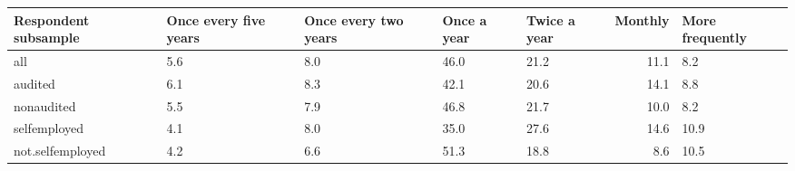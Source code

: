 \begin{table}[ht]
\centering
\begin{tabular}{lL{2cm}L{2cm}L{2cm}L{2cm}rL{2cm}}
  \hline
Respondent subsample & Once every five years & Once every two years & Once a year & Twice a year & Monthly & More frequently \\ 
  \hline
all & 5.6 & 8.0 & 46.0 & 21.2 & 11.1 & 8.2 \\ 
  audited & 6.1 & 8.3 & 42.1 & 20.6 & 14.1 & 8.8 \\ 
  nonaudited & 5.5 & 7.9 & 46.8 & 21.7 & 10.0 & 8.2 \\ 
  selfemployed & 4.1 & 8.0 & 35.0 & 27.6 & 14.6 & 10.9 \\ 
  not.selfemployed & 4.2 & 6.6 & 51.3 & 18.8 & 8.6 & 10.5 \\ 
   \hline
\end{tabular}
\end{table}
